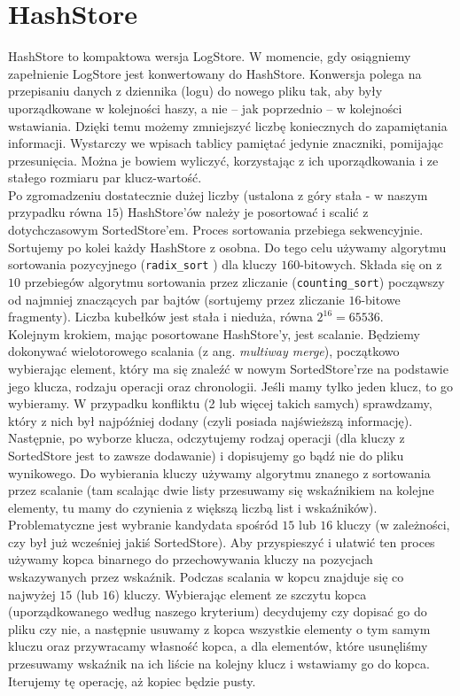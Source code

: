 \documentclass[declaration,shortabstract,masc]{iithesis}
\begin{document}
		\section{HashStore}
			HashStore to kompaktowa wersja LogStore. W momencie, gdy osiągniemy zapełnienie LogStore jest konwertowany do HashStore. Konwersja polega na przepisaniu danych z dziennika (logu) do nowego pliku tak, aby były uporządkowane w kolejności haszy, a nie -- jak poprzednio -- w kolejności wstawiania. Dzięki temu możemy zmniejszyć liczbę koniecznych do zapamiętania informacji. Wystarczy we wpisach tablicy pamiętać jedynie znaczniki, pomijając przesunięcia. Można je bowiem wyliczyć, korzystając z ich uporządkowania i ze stałego rozmiaru par klucz-wartość.\\
			\indent Po zgromadzeniu dostatecznie dużej liczby (ustalona z góry stała - w naszym przypadku równa $15$) HashStore'ów należy je posortować i scalić z dotychczasowym SortedStore'em. Proces sortowania przebiega sekwencyjnie. Sortujemy po kolei każdy HashStore z osobna. Do tego celu używamy algorytmu sortowania pozycyjnego (\texttt{radix\_sort} \cite{Cormen}) dla kluczy $160$-bitowych. Składa się on z $10$ przebiegów algorytmu sortowania przez zliczanie (\texttt{counting\_sort}) począwszy od najmniej znaczących par bajtów (sortujemy przez zliczanie $16$-bitowe fragmenty). Liczba kubełków jest stała i nieduża, równa $2^{16} = 65536$.\\
			\indent Kolejnym krokiem, mając posortowane HashStore'y, jest scalanie. Będziemy dokonywać wielotorowego scalania (z ang. \textit{multiway merge}), początkowo wybierając element, który ma się znaleźć w nowym SortedStore'rze na podstawie jego klucza, rodzaju operacji oraz chronologii. Jeśli mamy tylko jeden klucz, to go wybieramy. W przypadku konfliktu (2 lub więcej takich samych) sprawdzamy, który z nich był najpóźniej dodany (czyli posiada najświeższą informację). Następnie, po wyborze klucza, odczytujemy rodzaj operacji (dla kluczy z SortedStore jest to zawsze dodawanie) i dopisujemy go bądź nie do pliku wynikowego. Do wybierania kluczy używamy algorytmu znanego z sortowania przez scalanie (tam scalając dwie listy przesuwamy się wskaźnikiem na kolejne elementy, tu mamy do czynienia z większą liczbą list i wskaźników). Problematyczne jest wybranie kandydata spośród $15$ lub $16$ kluczy (w zależności, czy był już wcześniej jakiś SortedStore). Aby przyspieszyć i ułatwić ten proces używamy kopca binarnego do przechowywania kluczy na pozycjach wskazywanych przez wskaźnik. Podczas scalania w kopcu znajduje się co najwyżej $15$ (lub $16$) kluczy. Wybierając element ze szczytu kopca (uporządkowanego według naszego kryterium) decydujemy czy dopisać go do pliku czy nie, a następnie usuwamy z kopca wszystkie elementy o tym samym kluczu oraz przywracamy własność kopca, a dla elementów, które usunęliśmy przesuwamy wskaźnik na ich liście na kolejny klucz i wstawiamy go do kopca. Iterujemy tę operację, aż kopiec będzie pusty.
\end{document}
